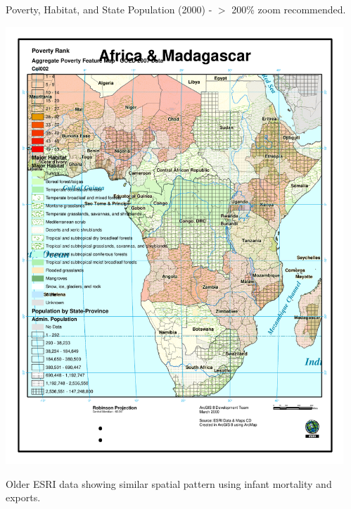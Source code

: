 \newpage

Poverty, Habitat, and State Population (2000) - $>$ 200\% zoom
recommended.

\includegraphics[width=5in]{Images/GIS/PovertyFeatureMapV5_Poverty_Habitat_StatePopulation.pdf}

\newpage

Older ESRI data showing similar spatial pattern using infant
mortality and exports.

